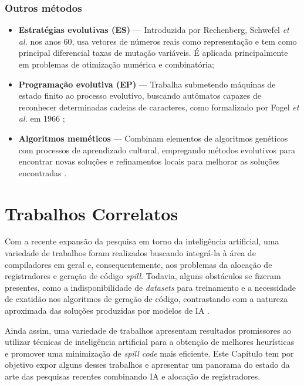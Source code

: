 \documentclass[
	12pt,				%
	openright,			%
	twoside,			%
	a4paper,			%
	tcc,			%
	]{ABNT-DC-UEL}
\begin{document}
\subsection{Outros métodos}

\begin{itemize}
    \item \textbf{Estratégias evolutivas (ES)} --- Introduzida por Rechenberg, Schwefel \textit{et al.} \cite{rechenberg:65, schwefel:95} nos anos 60, usa vetores de números reais como representação e tem como principal diferencial taxas de mutação variáveis. É aplicada principalmente em problemas de otimização numérica e combinatória;
    \item \textbf{Programação evolutiva (EP)} --- Trabalha submetendo máquinas de estado finito ao processo evolutivo, buscando autômatos capazes de reconhecer determinadas cadeias de caracteres, como formalizado por Fogel \textit{et al.} em 1966 \cite{fogel:66};
    \item \textbf{Algoritmos meméticos} --- Combinam elementos de algoritmos genéticos com processos de aprendizado cultural, empregando métodos evolutivos para encontrar novas soluções e refinamentos locais para melhorar as soluções encontradas \cite{chen:11}.
\end{itemize}

\chapter{Trabalhos Correlatos} \label{sec:trabalhos-correlatos}

Com a recente expansão da pesquisa em torno da inteligência artificial, uma variedade de trabalhos foram realizados buscando integrá-la à área de compiladores em geral e, consequentemente, aos problemas da alocação de registradores e geração de código \textit{spill}. Todavia, alguns obstáculos se fizeram presentes, como a indisponibilidade de \textit{datasets} para treinamento e a necessidade de exatidão nos algoritmos de geração de código, contrastando com a natureza aproximada das soluções produzidas por modelos de IA \cite{venkatakeerthy:23}.

Ainda assim, uma variedade de trabalhos apresentam resultados promissores ao utilizar técnicas de inteligência artificial para a obtenção de melhores heurísticas e promover uma minimização de \textit{spill code} mais eficiente. Este Capítulo tem por objetivo expor alguns desses trabalhos e apresentar um panorama do estado da arte das pesquisas recentes combinando IA e alocação de registradores.
\end{document}
